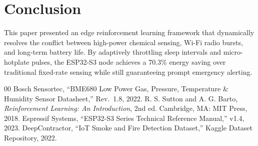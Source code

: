 \documentclass[10pt,twocolumn]{article}
\begin{document}
\section{Conclusion}
This paper presented an edge reinforcement learning framework that dynamically resolves the conflict between high-power chemical sensing, Wi-Fi radio bursts, and long-term battery life. By adaptively throttling sleep intervals and micro-hotplate pulses, the ESP32-S3 node achieves a 70.3\% energy saving over traditional fixed-rate sensing while still guaranteeing prompt emergency alerting.

\begin{thebibliography}{00}
 Bosch Sensortec, ``BME680 Low Power Gas, Pressure, Temperature \& Humidity Sensor Datasheet,'' Rev.\ 1.8, 2022.
 R. S. Sutton and A. G. Barto, \textit{Reinforcement Learning: An Introduction}, 2nd ed. Cambridge, MA: MIT Press, 2018.
 Espressif Systems, ``ESP32-S3 Series Technical Reference Manual,'' v1.4, 2023.
 DeepContractor, ``IoT Smoke and Fire Detection Dataset,'' Kaggle Dataset Repository, 2022.
\end{thebibliography}
\end{document}
